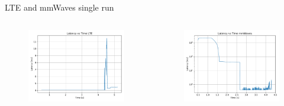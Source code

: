 \documentclass{beamer}
\begin{document}
\begin{frame}{LTE and mmWaves single run}
\begin{columns}
\begin{figure}
					\includegraphics[scale=0.32]{latency_lte_UDP}
				\end{figure}
				\begin{figure}
					\vspace{-0.3in}
					\includegraphics[scale=0.32]{latency_mmWaves_UDP}
				\end{figure}
		\end{columns}
	\end{frame}
\end{document}
